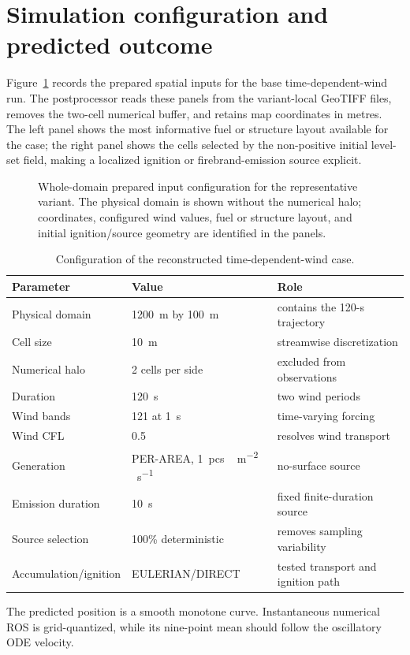 \section{Simulation configuration and predicted outcome}

Figure~\ref{fig:input-configuration} records the prepared spatial inputs for the base time-dependent-wind run.
The postprocessor reads these panels from the variant-local GeoTIFF files, removes the
two-cell numerical buffer, and retains map coordinates in metres.  The left panel shows
the most informative fuel or structure layout available for the case; the right panel
shows the cells selected by the non-positive initial level-set field, making a localized
ignition or firebrand-emission source explicit.

\begin{figure}[H]
\centering
{}
\caption{Whole-domain prepared input configuration for the representative variant.  The
physical domain is shown without the numerical halo; coordinates, configured wind values,
fuel or structure layout, and initial ignition/source geometry are identified in the panels.}
\label{fig:input-configuration}
\end{figure}

\begin{table}[htbp]
\centering
\caption{Configuration of the reconstructed time-dependent-wind case.}
\begin{tabular}{lll}
\toprule
Parameter & Value & Role\\
\midrule
Physical domain & \SI{1200}{m} by \SI{100}{m} & contains the 120-s trajectory\\
Cell size & \SI{10}{m} & streamwise discretization\\
Numerical halo & 2 cells per side & excluded from observations\\
Duration & \SI{120}{s} & two wind periods\\
Wind bands & 121 at \SI{1}{s} & time-varying forcing\\
Wind CFL & 0.5 & resolves wind transport\\
Generation & PER-AREA, \SI{1}{pcs\,m^{-2}\,s^{-1}} & no-surface source\\
Emission duration & \SI{10}{s} & fixed finite-duration source\\
Source selection & 100\% deterministic & removes sampling variability\\
Accumulation/ignition & EULERIAN/DIRECT & tested transport and ignition path\\
\bottomrule
\end{tabular}
\end{table}
The predicted position is a smooth monotone curve. Instantaneous numerical ROS
is grid-quantized, while its nine-point mean should follow the oscillatory ODE
velocity.

